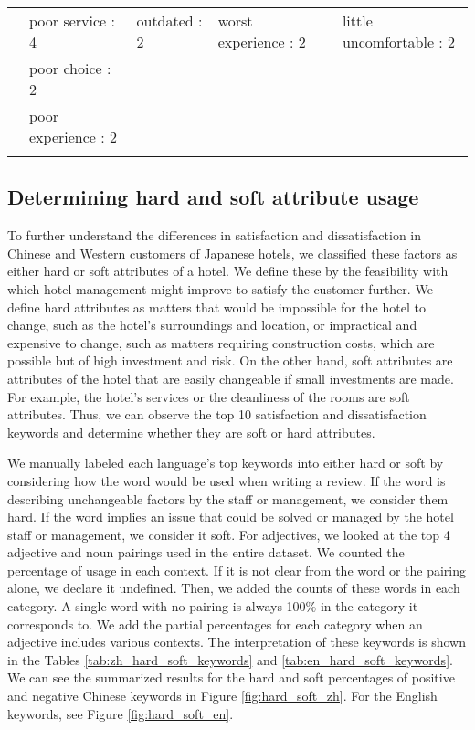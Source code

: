 \documentclass[smallextended,natbib]{svjour3}       %
\begin{document}
\begin{landscape}
\begin{table}[p]
{\begin{tabular}{|c|l|l|l|l|l|}
         &
          poor service : 4 &
          outdated : 2 &
          worst experience : 2 &
           &
          little uncomfortable : 2 \\
         &
          poor choice : 2 &
           &
           &
           &
           \\
         &
          poor experience : 2 &
           &
           &
           &
           \\
         &
           &
           &
           &
           &
           \\ \hline
        \end{tabular}%
        }
    \end{table}
    \end{landscape}

  \subsection{Determining hard and soft attribute usage}\label{det_hard_soft}

    To further understand the differences in satisfaction and dissatisfaction in Chinese and Western customers of Japanese hotels, we classified these factors as either hard or soft attributes of a hotel. We define these by the feasibility with which hotel management might improve to satisfy the customer further. We define hard attributes as matters that would be impossible for the hotel to change, such as the hotel's surroundings and location, or impractical and expensive to change, such as matters requiring construction costs, which are possible but of high investment and risk. On the other hand, soft attributes are attributes of the hotel that are easily changeable if small investments are made. For example, the hotel's services or the cleanliness of the rooms are soft attributes. Thus, we can observe the top 10 satisfaction and dissatisfaction keywords and determine whether they are soft or hard attributes.

    We manually labeled each language's top keywords into either hard or soft by considering how the word would be used when writing a review. If the word is describing unchangeable factors by the staff or management, we consider them hard. If the word implies an issue that could be solved or managed by the hotel staff or management, we consider it soft. For adjectives, we looked at the top 4 adjective and noun pairings used in the entire dataset. We counted the percentage of usage in each context. If it is not clear from the word or the pairing alone, we declare it undefined. Then, we added the counts of these words in each category. A single word with no pairing is always 100\% in the category it corresponds to. We add the partial percentages for each category when an adjective includes various contexts. The interpretation of these keywords is shown in the Tables \ref{tab:zh_hard_soft_keywords} and \ref{tab:en_hard_soft_keywords}. We can see the summarized results for the hard and soft percentages of positive and negative Chinese keywords in Figure \ref{fig:hard_soft_zh}. For the English keywords, see Figure \ref{fig:hard_soft_en}.
\end{document}
